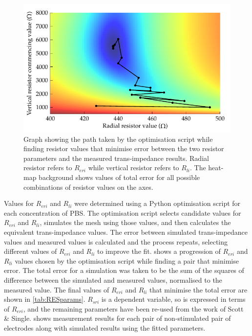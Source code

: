       \begin{figure}[ht]
        \centering
        \includegraphics{content/pt2/07-InterfaceModel/graphics/graph_optimisation_transimpedance}
        \caption{\label{fig:pt2-graph_transimpedance_optimisation}Graph showing the path taken by the optimisation script while finding resistor values that minimise error between the two resistor parameters and the measured trans-impedance results. Radial resistor refers to $R_{eri}$ while vertical resistor refers to $R_{li}$. The heat-map background shows values of total error for all possible combinations of resistor values on the axes.}
      \end{figure}
      Values for $R_{eri}$ and $R_{li}$ were determined using a Python optimisation script for each concentration of PBS.
      The optimisation script selects candidate values for $R_{eri}$ and $R_{li}$, simulates the mesh using those values, and then calculates the equivalent trans-impedance values.
      The error between simulated trans-impedance values and measured values is calculated and the process repeats, selecting different values of $R_{eri}$ and $R_{li}$ to improve the fit.
       shows a progression of $R_{eri}$ and $R_{li}$ values chosen by the optimisation script while finding a pair that minimise error.
      The total error for a simulation was taken to be the sum of the squares of difference between the simulated and measured values, normalised to the measured value.
      The final values of $R_{eri}$ and $R_{li}$ that minimise the total error are shown in \cref{tab:RESparams}.
      $R_{sri}$ is a dependent variable, so is expressed in terms of $R_{eri}$, and the remaining parameters have been re-used from the work of Scott \& Single.
       shows measurement results for each pair of non-stimulated pair of electrodes along with simulated results using the fitted parameters.



